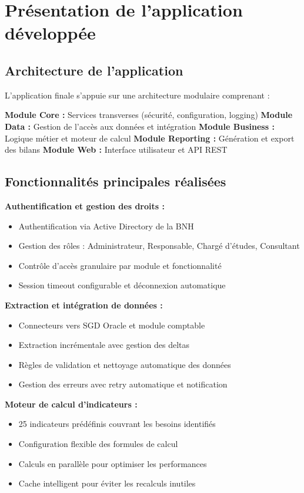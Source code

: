 \section{Présentation de l'application développée}

\subsection{Architecture de l'application}

L'application finale s'appuie sur une architecture modulaire comprenant :

\medskip

\textbf{Module Core :} Services transverses (sécurité, configuration, logging)
\textbf{Module Data :} Gestion de l'accès aux données et intégration
\textbf{Module Business :} Logique métier et moteur de calcul
\textbf{Module Reporting :} Génération et export des bilans
\textbf{Module Web :} Interface utilisateur et API REST

\subsection{Fonctionnalités principales réalisées}

\textbf{Authentification et gestion des droits :}
\begin{itemize}
    \item Authentification via Active Directory de la BNH
    \item Gestion des rôles : Administrateur, Responsable, Chargé d'études, Consultant
    \item Contrôle d'accès granulaire par module et fonctionnalité
    \item Session timeout configurable et déconnexion automatique
\end{itemize}

\textbf{Extraction et intégration de données :}
\begin{itemize}
    \item Connecteurs vers SGD Oracle et module comptable
    \item Extraction incrémentale avec gestion des deltas
    \item Règles de validation et nettoyage automatique des données
    \item Gestion des erreurs avec retry automatique et notification
\end{itemize}

\textbf{Moteur de calcul d'indicateurs :}
\begin{itemize}
    \item 25 indicateurs prédéfinis couvrant les besoins identifiés
    \item Configuration flexible des formules de calcul
    \item Calculs en parallèle pour optimiser les performances
    \item Cache intelligent pour éviter les recalculs inutiles
\end{itemize}

